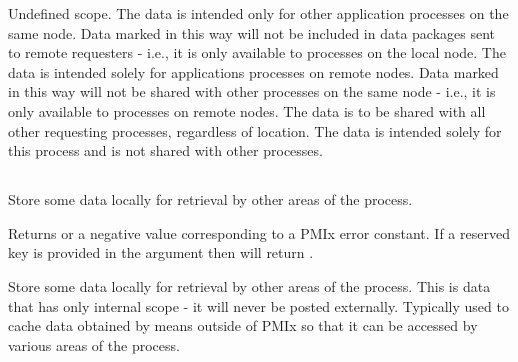 \begin{constantdesc}
%
Undefined scope.
%
The data is intended only for other application processes on the same node.
Data marked in this way will not be included in data packages sent to remote requesters - i.e., it is only available to processes on the local node.
%
The data is intended solely for applications processes on remote nodes.
Data marked in this way will not be shared with other processes on the same node - i.e., it is only available to  processes on remote nodes.
%
The data is to be shared with all other requesting processes, regardless of location.
%
The data is intended solely for this process and is not shared with other processes.
%
\end{constantdesc}


\subsection{}

\summary

Store some data locally for retrieval by other areas of the process.

\format


\begin{arglist}
\end{arglist}

Returns  or a negative value corresponding to a PMIx error constant.
If a reserved key is provided in the  argument then  will return .

\descr

Store some data locally for retrieval by other areas of the process.
This is data that has only internal scope - it will never be posted externally. Typically used to cache data obtained by means outside of \ac{PMIx} so that it can be accessed by various areas of the process.


